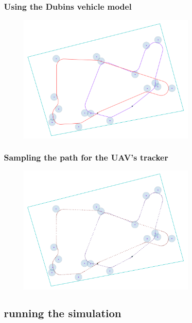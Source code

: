 \documentclass[aspectratio=1610]{beamer}
\begin{document}
  \begin{frame}
    \frametitle{Using the Dubins vehicle model}

    \begin{figure}
      \includegraphics[width=0.8\textwidth]{fig/mtspn_task/tsp_dubins.png}
    \end{figure}

  \end{frame}

  \begin{frame}
    \frametitle{Sampling the path for the UAV's tracker}

    \begin{figure}
      \includegraphics[width=0.8\textwidth]{fig/mtspn_task/tsp_dubins_sampled.png}
    \end{figure}

  \end{frame}

  \subsection{running the simulation}
\end{document}
